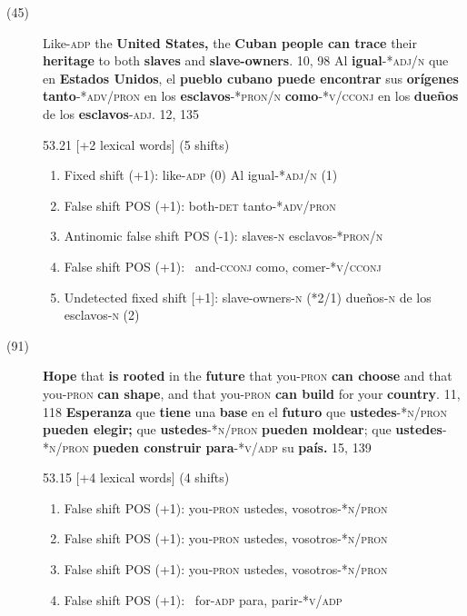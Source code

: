 \documentclass[output=paper]{langsci/langscibook}
\begin{document}
\begin{description}
  \item[(45)] Like\textsc{-adp} the \textbf{United States,} the \textbf{Cuban people can trace} their \textbf{heritage} to both \textbf{slaves} and \textbf{slave-owners}. 10, 98 \rightarrow Al \textbf{igual}\textsc{-*adj/n} que en \textbf{Estados Unidos}, el \textbf{pueblo cubano puede encontrar} sus \textbf{orígenes tanto}\textsc{-*adv/pron} en los \textbf{esclavos}\textsc{-*pron/n}\textbf{ como}\textsc{-*v/cconj} en los \textbf{dueños} de los \textbf{esclavos}\textsc{-adj}. 12, 135

    53.21 [+2 lexical words] (5 shifts)

    \begin{enumerate}
      \item Fixed shift (+1): like-\textsc{adp} (0) \rightarrow Al igual\textsc{-*adj/n} \textsc{(1)}
      \item False shift POS (+1): both-\textsc{det }\rightarrow tanto\textsc{-*adv/pron}
      \item Antinomic false shift POS (-1): slaves\textsc{-n }\rightarrow esclavos-*\textsc{pron/n}
      \item False shift POS (+1): \ and-\textsc{cconj }\rightarrow como, comer-*\textsc{v/cconj}
      \item Undetected fixed shift [+1]: slave-owners-\textsc{n} (*2/1) \rightarrow dueños-\textsc{n} de los esclavos-\textsc{n} (2)
    \end{enumerate}

  \item[(91)] \textbf{Hope} that \textbf{is rooted} in the \textbf{future} that you\textsc{-pron} \textbf{can choose} and that you\textsc{-pron} \textbf{can shape}, and that you\textsc{-pron} \textbf{can build} for your \textbf{country}. 11, 118 \rightarrow \textbf{Esperanza} que \textbf{tiene} una \textbf{base} en el \textbf{futuro} que \textbf{ustedes}\textsc{-*n/pron} \textbf{pueden elegir;} que \textbf{ustedes}\textsc{-*n/pron} \textbf{pueden moldear}; que \textbf{ustedes}\textsc{-*n/pron} \textbf{pueden construir} \textbf{para}\textsc{-*v/adp} su \textbf{país.} 15, 139

    53.15 [+4 lexical words] (4 shifts)

    \begin{enumerate}
      \item False shift POS (+1): you\textsc{-pron} \rightarrow ustedes, vosotros\textsc{-*n/pron}
      \item False shift POS (+1): you\textsc{-pron} \rightarrow ustedes, vosotros\textsc{-*n/pron}
      \item False shift POS (+1): you\textsc{-pron} \rightarrow ustedes, vosotros\textsc{-*n/pron}
      \item False shift POS (+1): \ for\textsc{-adp} \rightarrow para, parir\textsc{-*v/adp}
    \end{enumerate}


\end{description}
\end{document}
